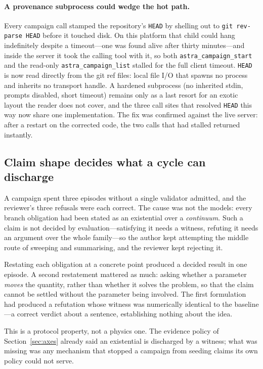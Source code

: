 \documentclass[11pt,a4paper]{article}
\newcommand{\code}[1]{\texttt{\small #1}}
\begin{document}
\paragraph{A provenance subprocess could wedge the hot path.} Every campaign call
stamped the repository's \code{HEAD} by shelling out to \code{git rev-parse
HEAD} before it touched disk. On this platform that child could hang
indefinitely despite a timeout---one was found alive after thirty minutes---and
inside the server it took the calling tool with it, so both
\code{astra\_campaign\_start} and the read-only \code{astra\_campaign\_list}
stalled for the full client timeout. \code{HEAD} is now read directly from the
git ref files: local file I/O that spawns no process and inherits no transport
handle. A hardened subprocess (no inherited stdin, prompts disabled, short
timeout) remains only as a last resort for an exotic layout the reader does not
cover, and the three call sites that resolved \code{HEAD} this way now share one
implementation. The fix was confirmed against the live server: after a restart
on the corrected code, the two calls that had stalled returned instantly.

\subsection{Claim shape decides what a cycle can discharge}
\label{sec:claimshape}

A campaign spent three episodes without a single validator admitted, and the
reviewer's three refusals were each correct. The cause was not the models: every
branch obligation had been stated as an existential over a \emph{continuum}.
Such a claim is not decided by evaluation---satisfying it needs a witness,
refuting it needs an argument over the whole family---so the author kept
attempting the middle route of sweeping and summarising, and the reviewer kept
rejecting it.

Restating each obligation at a concrete point produced a decided result in one
episode. A second restatement mattered as much: asking whether a parameter
\emph{moves} the quantity, rather than whether it solves the problem, so that
the claim cannot be settled without the parameter being involved. The first
formulation had produced a refutation whose witness was numerically identical to
the baseline---a correct verdict about a sentence, establishing nothing about
the idea.

This is a protocol property, not a physics one. The evidence policy of
Section~\ref{sec:axes} already said an existential is discharged by a witness;
what was missing was any mechanism that stopped a campaign from seeding claims
its own policy could not serve.
\end{document}
